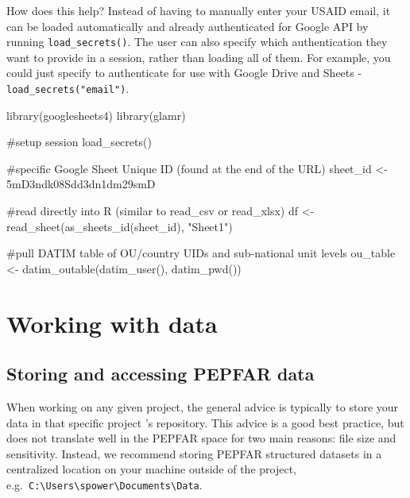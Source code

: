 \documentclass[
  letterpaper,
  DIV=11,
  numbers=noendperiod]{scrreprt}
\newenvironment{Shaded}{\begin{snugshade}}{\end{snugshade}}
\newcommand{\CommentTok}[1]{\textcolor[rgb]{0.37,0.37,0.37}{#1}}
\newcommand{\FunctionTok}[1]{\textcolor[rgb]{0.28,0.35,0.67}{#1}}
\newcommand{\NormalTok}[1]{\textcolor[rgb]{0.00,0.23,0.31}{#1}}
\newcommand{\OtherTok}[1]{\textcolor[rgb]{0.00,0.23,0.31}{#1}}
\newcommand{\StringTok}[1]{\textcolor[rgb]{0.13,0.47,0.30}{#1}}
\begin{document}
How does this help? Instead of having to manually enter your USAID
email, it can be loaded automatically and already authenticated for
Google API by running \texttt{load\_secrets()}. The user can also
specify which authentication they want to provide in a session, rather
than loading all of them. For example, you could just specify to
authenticate for use with Google Drive and Sheets -
\texttt{load\_secrets("email")}.

\begin{Shaded}
\begin{Highlighting}[]
\FunctionTok{library}\NormalTok{(googlesheets4)}
\FunctionTok{library}\NormalTok{(glamr)}

\CommentTok{\#setup session}
  \FunctionTok{load\_secrets}\NormalTok{()}

\CommentTok{\#specific Google Sheet Unique ID (found at the end of the URL)}
\NormalTok{  sheet\_id }\OtherTok{\textless{}{-}} \StringTok{\textquotesingle{}5mD3ndk08Sdd3dn1dm29smD\textquotesingle{}}

\CommentTok{\#read directly into R (similar to read\_csv or read\_xlsx)}
\NormalTok{  df }\OtherTok{\textless{}{-}} \FunctionTok{read\_sheet}\NormalTok{(}\FunctionTok{as\_sheets\_id}\NormalTok{(sheet\_id), }\StringTok{"Sheet1"}\NormalTok{)}
  
\CommentTok{\#pull DATIM table of OU/country UIDs and sub{-}national unit levels}
\NormalTok{  ou\_table }\OtherTok{\textless{}{-}} \FunctionTok{datim\_outable}\NormalTok{(}\FunctionTok{datim\_user}\NormalTok{(), }\FunctionTok{datim\_pwd}\NormalTok{())}
\end{Highlighting}
\end{Shaded}

\part{Working with data}

\hypertarget{storing-and-accessing-pepfar-data}{%
\chapter{Storing and accessing PEPFAR
data}\label{storing-and-accessing-pepfar-data}}

When working on any given project, the general advice is typically to
store your data in that specific project 's repository. This advice is a
good best practice, but does not translate well in the PEPFAR space for
two main reasons: file size and sensitivity. Instead, we recommend
storing PEPFAR structured datasets in a centralized location on your
machine outside of the project,
e.g.~\texttt{C:\textbackslash{}Users\textbackslash{}spower\textbackslash{}Documents\textbackslash{}Data}.
\end{document}
